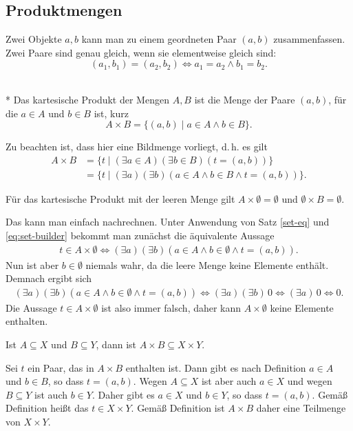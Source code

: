 \newpage
\subsection{Produktmengen}
Zwei Objekte $a,b$ kann man zu einem geordneten Paar $(a,b)$
zusammenfassen. Zwei Paare sind genau gleich, wenn sie
elementweise gleich sind:
\[(a_1,b_1) = (a_2,b_2) \iff a_1=a_2\land b_1=b_2.\]

\begin{Definition}\mbox{}\\*
Das kartesische Produkt der Mengen $A,B$ ist die Menge der
Paare $(a,b)$, für die $a\in A$ und $b\in B$ ist, kurz
\[A\times B = \{(a,b)\mid a\in A\land b\in B\}.\]
\end{Definition}
Zu beachten ist, dass hier eine Bildmenge vorliegt, d.\,h. es gilt
\begin{align*}
A\times B &= \{t\mid(\exists a\in A)(\exists b\in B)(t=(a,b))\}\\
&= \{t\mid(\exists a)(\exists b)(a\in A\land b\in B\land t=(a,b))\}.
\end{align*}

\begin{Satz}
Für das kartesische Produkt mit der leeren Menge gilt $A\times\emptyset=\emptyset$
und $\emptyset\times B=\emptyset$.
\end{Satz}
 Das kann man einfach nachrechnen.
Unter Anwendung von Satz \ref{set-eq} und \eqref{eq:set-builder}
bekommt man zunächst die äquivalente Aussage
\begin{gather*}
t\in A\times\emptyset \iff (\exists a)(\exists b)(a\in A\land b\in\emptyset\land t=(a,b)).
\end{gather*}
Nun ist aber $b\in\emptyset$ niemals wahr, da die leere Menge keine
Elemente enthält. Demnach ergibt sich
\begin{gather*}
(\exists a)(\exists b)(a\in A\land b\in\emptyset\land t=(a,b))
\iff (\exists a)(\exists b)\, 0 \iff (\exists a)\,0\iff 0.
\end{gather*}
Die Aussage $t\in A\times\emptyset$ ist also immer falsch,
daher kann $A\times\emptyset$ keine Elemente enthalten.\;\qedsymbol

\begin{Satz}
Ist $A\subseteq X$ und $B\subseteq Y$, dann ist
$A\times B\subseteq X\times Y$.
\end{Satz}
 Sei $t$ ein Paar, das in
$A\times B$ enthalten ist. Dann gibt es nach Definition
$a\in A$ und $b\in B$, so dass $t=(a,b)$. Wegen
$A\subseteq X$ ist aber auch $a\in X$ und wegen $B\subseteq Y$
ist auch $b\in Y$. Daher gibt es $a\in X$ und $b\in Y$, so dass
$t=(a,b)$. Gemäß Definition heißt das $t\in X\times Y$. Gemäß
Definition ist $A\times B$ daher eine Teilmenge von $X\times Y$.\;\qedsymbol

